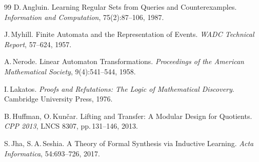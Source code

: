 \documentclass[11pt,a4paper]{article}
\theoremstyle{preprintthm}
\theoremstyle{preprintdef}
\begin{document}
\begin{thebibliography}{99}
D.\,Angluin. Learning Regular Sets from Queries and Counterexamples. \emph{Information and Computation}, 75(2):87--106, 1987.

J.\,Myhill. Finite Automata and the Representation of Events. \emph{WADC Technical Report}, 57--624, 1957.

A.\,Nerode. Linear Automaton Transformations. \emph{Proceedings of the American Mathematical Society}, 9(4):541--544, 1958.

I.\,Lakatos. \emph{Proofs and Refutations: The Logic of Mathematical Discovery}. Cambridge University Press, 1976.

B.\,Huffman, O.\,Kun\v{c}ar. Lifting and Transfer: A Modular Design for Quotients. \emph{CPP 2013}, LNCS 8307, pp.\,131--146, 2013.

S.\,Jha, S.\,A.\,Seshia. A Theory of Formal Synthesis via Inductive Learning. \emph{Acta Informatica}, 54:693--726, 2017.
\end{thebibliography}
\end{document}
